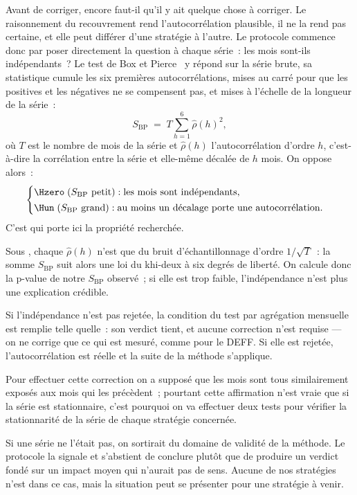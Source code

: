 Avant de corriger, encore faut-il qu'il y ait quelque chose à corriger. Le
raisonnement du recouvrement rend l'autocorrélation plausible, il ne la rend
pas certaine, et elle peut différer d'une stratégie à l'autre. Le protocole
commence donc par poser directement la question à chaque série~: les mois
sont-ils indépendants~? Le test de Box et Pierce~\cite{boxpierce1970} y répond sur la série brute,
sa statistique cumule les six premières autocorrélations, mises au carré pour
que les positives et les négatives ne se compensent pas, et mises à l'échelle
de la longueur de la série~:
\[
  S_{\mathrm{BP}} \;=\; T \sum_{h=1}^{6} \hat\rho(h)^2 ,
\]
où \(T\) est le nombre de mois de la série et \(\hat\rho(h)\)
l'autocorrélation d'ordre \(h\), c'est-à-dire la corrélation entre la série
et elle-même décalée de \(h\) mois. On oppose alors~:
\[
  \begin{cases}
    \Hzero \;(S_{\mathrm{BP}} \text{ petit}) : \text{les mois sont indépendants,}\\[2pt]
    \Hun \;(S_{\mathrm{BP}} \text{ grand}) : \text{au moins un décalage porte une autocorrélation.}
  \end{cases}
\]
C'est \Hzero{} qui porte ici la propriété recherchée.

Sous \Hzero{}, chaque $\hat\rho(h)$ n'est que du bruit d'échantillonnage
d'ordre $1/\sqrt{T}$~: la somme $S_{\mathrm{BP}}$ suit alors une loi du
khi-deux à six degrés de liberté. On calcule donc la p-value
de notre $S_{\mathrm{BP}}$ observé~; si elle est trop faible, l'indépendance
n'est plus une explication crédible.

Si l'indépendance n'est pas rejetée, la condition du test par
agrégation mensuelle est remplie telle quelle~: son verdict tient, et aucune
correction n'est requise — on ne corrige que ce qui est mesuré, comme pour le
DEFF. Si elle est rejetée, l'autocorrélation est réelle et la suite de la
méthode s'applique.

Pour effectuer cette correction on a supposé que les mois sont tous
similairement exposés aux mois qui les précèdent~; pourtant cette affirmation
n'est vraie que si la série est stationnaire, c'est pourquoi on va effectuer
deux tests pour vérifier la stationnarité de la série de chaque stratégie
concernée.

Si une série ne l'était pas, on sortirait du domaine de validité de la
méthode. Le protocole la signale et s'abstient de conclure plutôt que de
produire un verdict fondé sur un impact moyen qui n'aurait pas de sens. Aucune
de nos stratégies n'est dans ce cas, mais la situation peut se présenter pour
une stratégie à venir.

